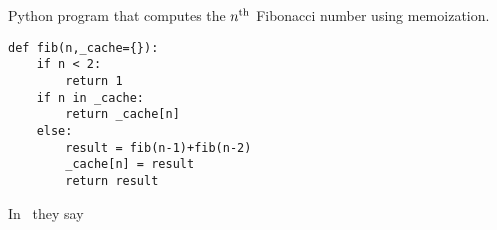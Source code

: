 \begin{Program}
  \caption{\label{prog:fib} Python program that computes the $n^{\rm
      th}$ Fibonacci number using memoization.}
\begin{verbatim}
def fib(n,_cache={}):
    if n < 2:
        return 1
    if n in _cache:
        return _cache[n]
    else:
        result = fib(n-1)+fib(n-2)
        _cache[n] = result
        return result
\end{verbatim}
\end{Program}

In~\cite{1929PNAS...15..168H} they say ~\cite{1948MNRAS.108..252B}
